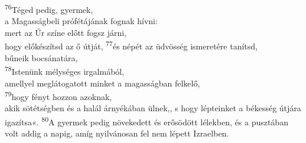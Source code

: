 \documentclass[10pt]{article}
\begin{document}
\begin{multicols}{2}
\textsuperscript{76}Téged pedig, gyermek, \\ a Magasságbeli prófétájának fognak hívni: \\ mert az Úr színe előtt fogsz járni, \\ hogy előkészítsd az ő útját,  
\textsuperscript{77}és népét az üdvösség ismeretére tanítsd, \\ bűneik bocsánatára, \\  
\textsuperscript{78}Istenünk mélységes irgalmából, \\ amellyel meglátogatott minket a magasságban felkelő, \\  
\textsuperscript{79}hogy fényt hozzon azoknak, \\ akik sötétségben és a halál árnyékában ülnek,, s hogy lépteinket a békesség útjára igazítsa«.  
\textsuperscript{80}A gyermek pedig növekedett és erősödött lélekben, és a pusztában volt addig a napig, amíg nyilvánosan fel nem lépett Izraelben.


\end{multicols}
\end{document}
